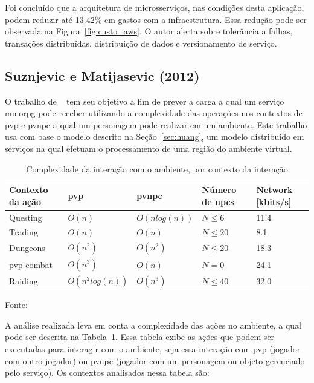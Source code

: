 Foi concluído que a arquitetura de microsserviços, nas condições desta aplicação, podem reduzir até 13.42\% em gastos com a infraestrutura.
%
Essa redução pode ser observada na Figura~\ref{fig:custo_aws}.
%
O autor alerta sobre tolerância a falhas, transações distribuídas, distribuição de dados e versionamento de serviço.


\subsection{Suznjevic e Matijasevic (2012)}



O trabalho de ~\cite{6374456} tem seu objetivo a fim de prever a carga a qual um serviço \ac{mmorpg} pode receber utilizando a complexidade das operações nos contextos de \ac{pvp} e \ac{pvnpc} a qual um personagem pode realizar em um ambiente.
%
Este trabalho usa com base o modelo descrito na Seção~\ref{sec:huang}, um modelo distribuído em serviços na qual efetuam o processamento de uma região do ambiente virtual.



\begin{table}[htb!]
\centering
\caption{Complexidade da interação com o ambiente, por contexto da interação}
\label{tab:complexidade}
\begin{tabular}{|l|l|l|l|l|}
\hline
Contexto da ação        & \ac{pvp}           & \ac{pvnpc}              & Número de \acp{npc}    & Network {[}kbits/s{]} \\ \hline
Questing                & $O(n)$             & $O(n log(n))$           & $N \leq 6 $            & 11.4          \\ \hline
Trading                 & $O(n)$             & $O(n)$                  & $N \leq 20$            & 8.1           \\ \hline
Dungeons                & $O(n^2)$           & $O(n^2)$                & $N \leq 20$            & 18.3          \\ \hline
\ac{pvp} combat         & $O(n^3)$           & $O(n)$                  & $N = 0    $            & 24.1          \\ \hline
Raiding                 & $O(n^2 log(n))$    & $O(n^3)$                & $N \leq 40$            & 32.0          \\ \hline
\end{tabular}

Fonte:~\cite{6374456}
\end{table}


A análise realizada leva em conta a complexidade das ações no ambiente, a qual pode ser descrita na Tabela~\ref{tab:complexidade}.
%
Essa tabela exibe as ações que podem ser executadas para interagir com o ambiente, seja essa interação com \ac{pvp} (jogador com outro jogador) ou \ac{pvnpc} (jogador com um personagem ou objeto gerenciado pelo serviço).
%
Os contextos analisados nessa tabela são:

